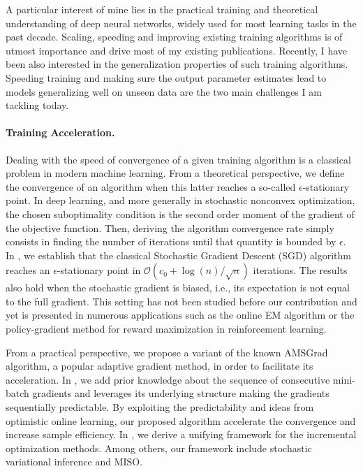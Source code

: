 \documentclass[twoside,11pt]{article}
\begin{document}
\vspace{0.2in}
\textbf{}
\vspace{0.2in}

A particular interest of mine lies in the practical training and theoretical understanding of deep neural networks, widely used for most learning tasks in the past decade.
Scaling, speeding and improving existing training algorithms is of utmost importance and drive most of my existing publications.
Recently, I have been also interested in the generalization properties of such training algorithms. 
Speeding training and making sure the output parameter estimates lead to models generalizing well on unseen data are the two main challenges I am tackling today.

\vspace{0.08in}
\paragraph{Training Acceleration.} 
Dealing with the speed of convergence of a given training algorithm is a classical problem in modern machine learning.
From a theoretical perspective, we define the convergence of an algorithm when this latter reaches a so-called $\epsilon$-stationary point.
In deep learning, and more generally in stochastic nonconvex optimization, the chosen suboptimality condition is the second order moment of the gradient of the objective function. 
Then, deriving the algorithm convergence rate simply consists in finding the number of iterations until that quantity is bounded by $\epsilon$.
In \citep{karimi2019non}, we  establish that the classical Stochastic Gradient Descent (SGD) algorithm reaches an $\epsilon$-stationary point in $\mathcal{O}\left(c_{0}+\log (n) / \sqrt{n}\right)$ iterations. 
The results also hold when the stochastic gradient is biased, i.e., its expectation is not equal to the full gradient. 
This setting has not been studied before our contribution and yet is presented in numerous applications such as the online EM algorithm or the policy-gradient method for reward maximization in reinforcement learning.

From a practical perspective, we propose a variant of the known AMSGrad algorithm, a popular adaptive gradient method, in order to facilitate its acceleration.
In \citep{kun2020}, we add prior knowledge about the sequence of consecutive mini-batch gradients and leverages its underlying structure making the gradients sequentially predictable. 
By exploiting the predictability and ideas from optimistic online learning, our proposed algorithm accelerate the convergence and increase sample efficiency.
In \citep{karimi2019misso}, we derive a unifying framework for the incremental optimization methods. 
Among others, our framework include stochastic variational inference and MISO.
\end{document}

